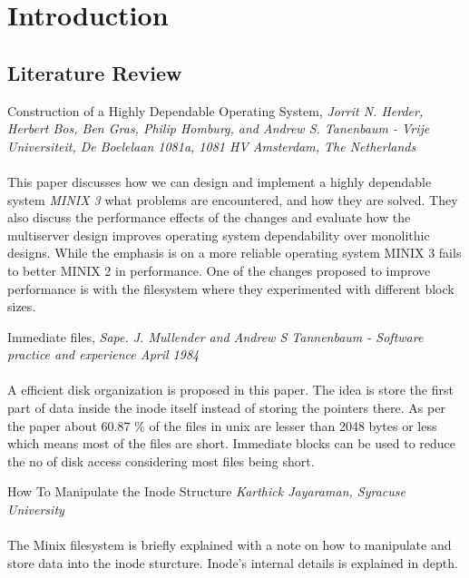 \chapter{Introduction}

\section{Literature Review}

\vspace{10mm}
 Construction of a Highly Dependable Operating System, { \em Jorrit N. Herder, Herbert Bos, Ben Gras, Philip Homburg, and Andrew S. Tanenbaum - Vrije Universiteit, De Boelelaan 1081a, 1081 HV Amsterdam, The Netherlands
}\cite{chdos}
\\
\\
This paper discusses how we can design and implement a highly dependable system { \em MINIX 3} what problems are encountered, and how they are solved. They also discuss the performance effects of the changes and evaluate how the multiserver design improves operating system dependability over monolithic designs. While the emphasis is on a more reliable operating system MINIX 3 fails to better MINIX 2 in performance. One of the changes proposed to improve performance is with the filesystem where they experimented with different block sizes.

\vspace{10mm}

Immediate files, { \em  Sape. J. Mullender and Andrew S Tannenbaum - Software practice and experience April 1984 }\cite{astimme}
\\
\\
A efficient disk organization is proposed in this paper. The idea is store the first part of data inside the inode itself instead of storing the pointers there. As per the paper about 60.87 \% of the files in unix are lesser than 2048 bytes or less which means most of the files are short. Immediate blocks can be used to reduce the no of disk access considering most files being short.

\pagebreak
How To Manipulate the Inode Structure  { \em Karthick Jayaraman, Syracuse University } \cite{inode}
\\ 
\\
The Minix filesystem is briefly explained with a note on how to manipulate and store data into the inode sturcture. Inode's internal details is explained in depth.

\vspace{10mm}

